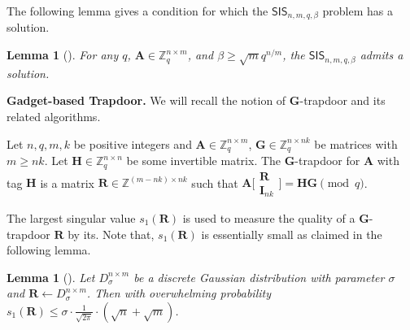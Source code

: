 \documentclass[a4paper,11pt,onecolumn]{elsarticle}
\newtheorem{lemma}[theorem]{Lemma}
\begin{document}
	The following lemma gives a condition for which the $\mathsf{SIS}_{n,m,q,\beta}$ problem has a solution. 
	
	\begin{lemma}[{\cite[Lemma 5.2]{MR07}}] \label{sissolution}
		For any $q$, $\textbf{A} \in \mathbb{Z}_q^{n \times m}$, and $\beta \geq \sqrt{m}q^{n/m}$, the $ \mathsf{SIS}_{n,m,q,\beta} $ admits a solution.
	\end{lemma}
	
	
	

\noindent \textbf{Gadget-based Trapdoor.} We will recall the notion of \textbf{G}-trapdoor and its related algorithms.

\begin{definition} \label{gtrapdoor}
	Let $ n, q, m, k $ be positive integers and $ \mathbf{A}\in \mathbb{Z}_q^{n\times m} $, $\mathbf{G} \in \mathbb{Z}_q^{n\times nk}$ be matrices with $m \geq nk$. Let $ \mathbf{H}\in \mathbb{Z}_q^{n\times n} $ be some invertible matrix. The $ \mathbf{G} $-trapdoor for $ \mathbf{A} $ with tag $ \mathbf{H} $ is a matrix $ \mathbf{R} \in \mathbb{Z}^{(m-nk)\times nk} $ such that $ \mathbf{A}\bigl[\begin{smallmatrix}
	\mathbf{R}\\ \textbf{I}_{nk}
	\end{smallmatrix} \bigr] = \mathbf{H}\mathbf{G} \pmod q $.  
\end{definition}
The largest singular value $s_1(\textbf{R})$ is used to measure the quality of a \textbf{G}-trapdoor $ \mathbf{R} $ by its. Note that, $s_1(\textbf{R})$  is essentially small as claimed in the following lemma. 
\begin{lemma}[{\cite[Lemma 2.9]{MP12}}] \label{supnorm}
	Let $ D_\sigma^{n\times m} $ be a discrete Gaussian distribution with parameter $ \sigma $ and $ \mathbf{R}\leftarrow D_\sigma^{n\times m} $.  Then with overwhelming probability $ s_1(\mathbf{R}) \le \sigma \cdot \frac{1}{\sqrt{2\pi}}\cdot (\sqrt{n}+\sqrt{m}) $.
\end{lemma}
\end{document}
